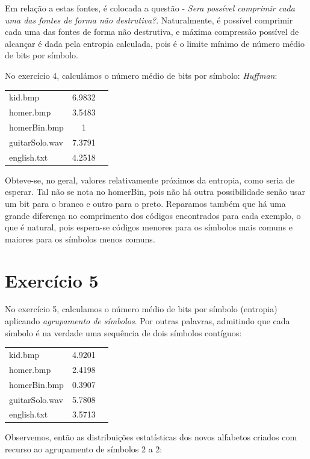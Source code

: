 \documentclass[12pt]{article}
\begin{document}
  Em relação a estas fontes, é colocada a questão - \textit{Sera possível
  comprimir cada uma das fontes de forma não destrutiva?}. Naturalmente, é possível comprimir cada uma das fontes de forma não destrutiva, e máxima compressão possível de alcançar é dada pela entropia calculada, pois é o limite mínimo de número médio de bits por símbolo.

  No exercício 4, calculámos o número médio de bits por símbolo:
  \textit{Huffman}:

  \begin{tabular}{ l c r }
    kid.bmp & 6.9832 \\
    homer.bmp & 3.5483 \\
    homerBin.bmp & 1 \\
    guitarSolo.wav & 7.3791 \\
    english.txt & 4.2518 \\
  \end{tabular}


Obteve-se, no geral, valores relativamente próximos da entropia, como seria de esperar. Tal não se nota no homerBin, pois não há outra possibilidade senão usar um bit para o branco e outro para o preto.
Reparamos também que há uma grande diferença no comprimento dos códigos encontrados para cada exemplo, o que é natural, pois espera-se códigos menores para os símbolos mais comuns e maiores para os símbolos menos comuns.

\section*{Exercício 5}

  No exercício 5, calculamos o número médio de bits por símbolo (entropia)
  aplicando \textit{agrupamento de símbolos}. Por outras palavras, admitindo
  que cada símbolo é na verdade uma sequência de dois símbolos contíguos:

  \begin{tabular}{ l c r }
    kid.bmp & 4.9201 \\
    homer.bmp & 2.4198 \\
    homerBin.bmp & 0.3907 \\
    guitarSolo.wav & 5.7808 \\
    english.txt & 3.5713 \\
  \end{tabular}

  Observemos, então as distribuições estatísticas dos novos alfabetos criados
  com recurso ao agrupamento de símbolos 2 a 2:
\end{document}
